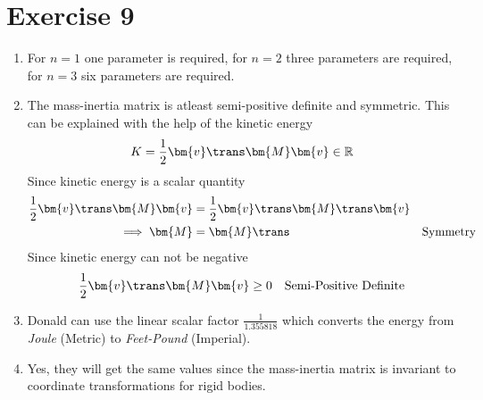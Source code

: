 \section{Exercise 9}
\begin{enumerate}
	\item For $n = 1$ one parameter is required, for $n = 2$ three parameters are required, for $n = 3$ six parameters are required.
	\item The mass-inertia matrix is atleast semi-positive definite and symmetric. This can be explained with the help of the kinetic energy
	\begin{equation*}
		K = \frac{1}{2}\bm{v}\trans\bm{M}\bm{v} \in \mathbb{R}
	\end{equation*}
	Since kinetic energy is a scalar quantity
	\begin{align*}
		\frac{1}{2}\bm{v}\trans\bm{M}\bm{v} &= \frac{1}{2}\bm{v}\trans\bm{M}\trans\bm{v}\\
		\implies \bm{M} &= \bm{M}\trans & \text{Symmetry}
	\end{align*}
	Since kinetic energy can not be negative
	\begin{align*}
		\frac{1}{2}\bm{v}\trans\bm{M}\bm{v} &\geq 0 & \text{Semi-Positive Definite}
	\end{align*}
	\item Donald can use the linear scalar factor $\frac{1}{1.355818}$ which converts the energy from \emph{Joule} (Metric) to \emph{Feet-Pound} (Imperial).
	\item Yes, they will get the same values since the mass-inertia matrix is invariant to coordinate transformations for rigid bodies.
\end{enumerate}